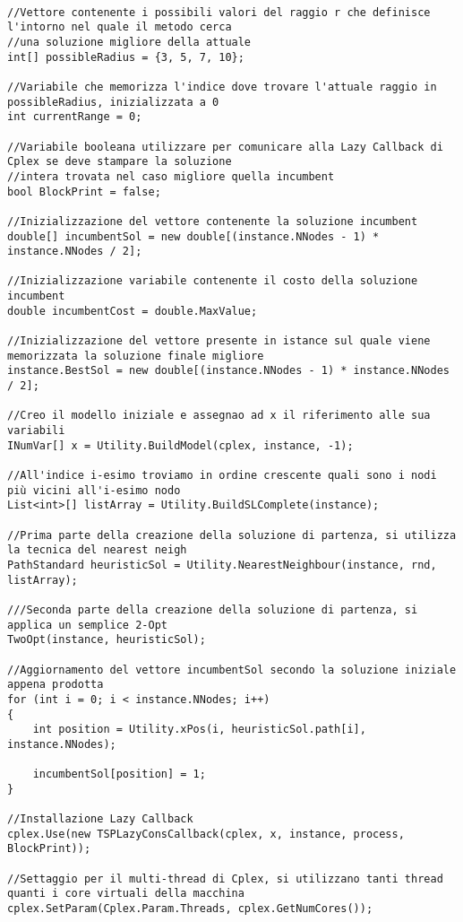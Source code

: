 \documentclass[11pt]{article}
\begin{document}
\begin{lstlisting}

//Vettore contenente i possibili valori del raggio r che definisce l'intorno nel quale il metodo cerca
//una soluzione migliore della attuale
int[] possibleRadius = {3, 5, 7, 10};

//Variabile che memorizza l'indice dove trovare l'attuale raggio in possibleRadius, inizializzata a 0
int currentRange = 0;

//Variabile booleana utilizzare per comunicare alla Lazy Callback di Cplex se deve stampare la soluzione
//intera trovata nel caso migliore quella incumbent
bool BlockPrint = false;

//Inizializzazione del vettore contenente la soluzione incumbent
double[] incumbentSol = new double[(instance.NNodes - 1) * instance.NNodes / 2];

//Inizializzazione variabile contenente il costo della soluzione incumbent
double incumbentCost = double.MaxValue;

//Inizializzazione del vettore presente in istance sul quale viene memorizzata la soluzione finale migliore
instance.BestSol = new double[(instance.NNodes - 1) * instance.NNodes / 2];

//Creo il modello iniziale e assegnao ad x il riferimento alle sua variabili
INumVar[] x = Utility.BuildModel(cplex, instance, -1);

//All'indice i-esimo troviamo in ordine crescente quali sono i nodi più vicini all'i-esimo nodo
List<int>[] listArray = Utility.BuildSLComplete(instance);

//Prima parte della creazione della soluzione di partenza, si utilizza la tecnica del nearest neigh
PathStandard heuristicSol = Utility.NearestNeighbour(instance, rnd, listArray);

///Seconda parte della creazione della soluzione di partenza, si applica un semplice 2-Opt
TwoOpt(instance, heuristicSol);

//Aggiornamento del vettore incumbentSol secondo la soluzione iniziale appena prodotta
for (int i = 0; i < instance.NNodes; i++)
{
    int position = Utility.xPos(i, heuristicSol.path[i], instance.NNodes);

    incumbentSol[position] = 1;
}

//Installazione Lazy Callback
cplex.Use(new TSPLazyConsCallback(cplex, x, instance, process, BlockPrint));

//Settaggio per il multi-thread di Cplex, si utilizzano tanti thread quanti i core virtuali della macchina
cplex.SetParam(Cplex.Param.Threads, cplex.GetNumCores());


\end{lstlisting}
\end{document}
